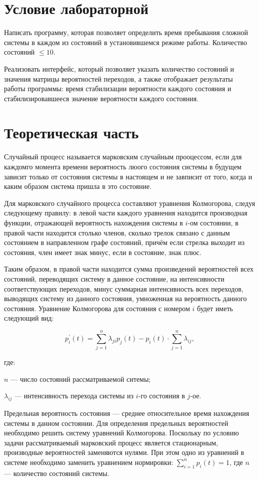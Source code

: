 \chapter{Условие лабораторной}

Написать программу, которая позволяет определить время пребывания сложной системы в каждом из состояний в установившемся режиме работы. Количество состояний $\le 10$.

Реализовать интерфейс, который позволяет указать количество состояний и значения матрицы вероятностей переходов, а также отображает результаты работы программы: время стабилизации вероятности каждого состояния и стабилизировавшееся значение вероятности каждого состояния.

\chapter{Теоретическая часть}

Случайный процесс называется марковским случайным прооцессом, если для каждомго момента времени вероятность люого состояния системы в будущем зависит только от состояния системы в настоящем и не завписит от того, когда и каким образом система пришла в это состояние.

Для марковского случайного процесса составляют уравнения Колмогорова, следуя следующему правилу: в левой части каждого уравнения находится производная функции, отражающей вероятность нахождения системы в $i$-ом состоянии, в правой части находится столько членов, сколько трелок связано с данным состоянием в направленном графе состояний, причём если стрелка выходит из состояния, член имеет знак минус, если в состояние, знак плюс. 

Таким образом, в правой части находится сумма произведений вероятностей всех состояний, переводящих систему в данное состояние, на интенсивности соответствующих переходов, минус суммарная интенсивность всех переходов, выводящих систему из данного состояния, умноженная на вероятность данного состояния. Уравнение Колмогорова для состояния с номером $i$ будет иметь следующий вид:

\begin{equation}
	p^{'}_{i}(t) = \sum_{j=1}^{n}\lambda_{ji}p_{j}(t) - p_{i}(t)\cdot \sum_{j=1}^{n}\lambda_{ij},
\end{equation}

где:

$n$ --- число состояний рассматриваемой ситемы;

$\lambda_{ij}$ --- интенсивность перехода системы из $i$-го состояния в $j$-ое.

Предельная вероятность состояния --- среднее относительное время нахождения системы в данном состоянии.
Для определения предельных вероятностей необходимо решить систему уравнений Колмогорова. 
Поскольку по условию задачи рассматриваемый марковский процесс является стационарным, производные вероятностей заменяются нулями. 
При этом одно из уравнений в системе необходимо заменить уравнением нормировки: $\sum_{i = 1}^{n}p_{i}(t) = 1$, где $n$ --- количество состояний системы.